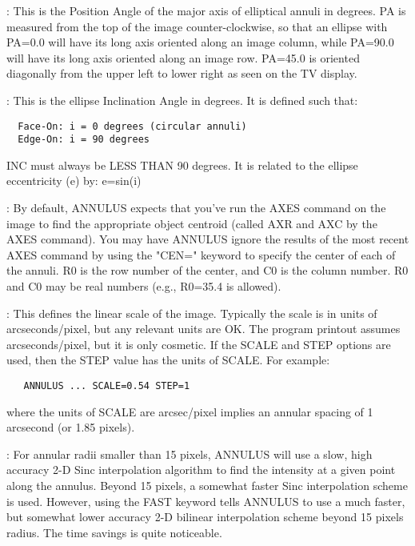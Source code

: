 :\newline 
This is the Position Angle of the major axis of elliptical annuli in
degrees.  PA is measured from the top of the image counter-clockwise, so
that an ellipse with PA=0.0 will have its long axis oriented along an image
column, while PA=90.0 will have its long axis oriented along an image
row. PA=45.0 is oriented diagonally from the upper left to lower right as
seen on the TV display.

:\newline
This is the ellipse Inclination Angle in degrees.  It is defined such that:
\begin{verbatim}
  Face-On: i = 0 degrees (circular annuli) 
  Edge-On: i = 90 degrees
\end{verbatim}
INC must always be LESS THAN 90 degrees.  It is related to the ellipse
eccentricity (e) by: e=sin(i)

:\newline
By default, ANNULUS expects that you've run the AXES command on the image
to find the appropriate object centroid (called AXR and AXC by the AXES
command).  You may have ANNULUS ignore the results of the most recent AXES
command by using the "CEN=" keyword to specify the center of each of the
annuli. R0 is the row number of the center, and C0 is the column number. R0
and C0 may be real numbers (e.g., R0=35.4 is allowed).

:\newline
This defines the linear scale of the image.  Typically the scale is in
units of arcseconds/pixel, but any relevant units are OK. The program
printout assumes arcseconds/pixel, but it is only cosmetic.  If the SCALE
and STEP options are used, then the STEP value has the units of SCALE. For
example:\begin{verbatim}
   ANNULUS ... SCALE=0.54 STEP=1
\end{verbatim}
where the units of SCALE are arcsec/pixel implies an annular spacing of 1
arcsecond (or 1.85 pixels).

:\newline
For annular radii smaller than 15 pixels, ANNULUS will use a slow, high
accuracy 2-D Sinc interpolation algorithm to find the intensity at a given
point along the annulus.  Beyond 15 pixels, a somewhat faster Sinc
interpolation scheme is used.  However, using the FAST keyword tells
ANNULUS to use a much faster, but somewhat lower accuracy 2-D bilinear
interpolation scheme beyond 15 pixels radius.  The time savings is quite
noticeable.

